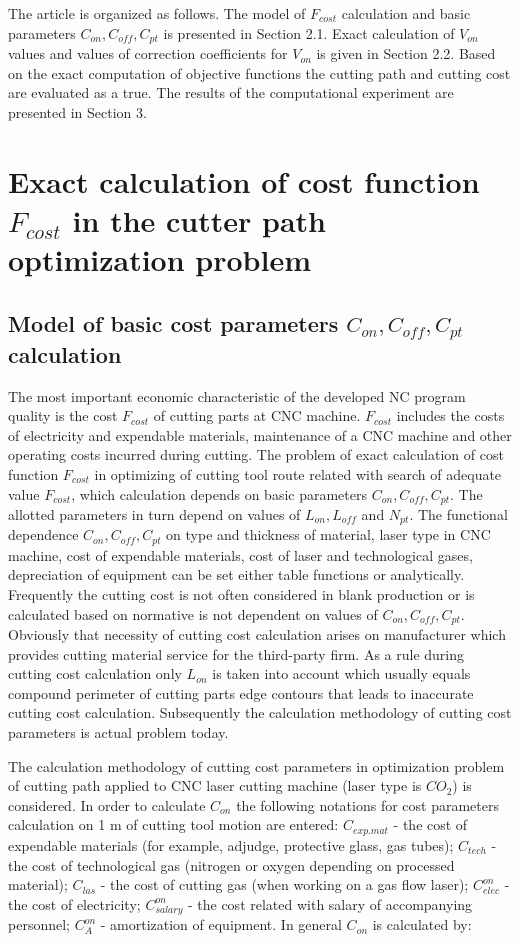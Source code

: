 \documentclass[runningheads]{llncs}
\begin{document}
The article is organized as follows.
The model of $F_{cost}$
calculation and basic parameters
$C_{on}, C_{off}, C_{pt}$
is presented in Section 2.1.
Exact calculation of $V_{on}$
values and values of correction coefficients for $V_{on}$
is given in Section 2.2.
Based on the exact computation of objective functions
the cutting path and cutting cost are evaluated as a true.
The results of the computational experiment are presented in Section 3.

\section{Exact calculation of cost function $F_{cost}$ in the cutter path optimization problem}

\subsection{Model of basic cost parameters $C_{on}, C_{off}, C_{pt}$ calculation}

The most important economic characteristic of the developed NC program quality is the cost $F_{cost}$
of cutting parts at CNC machine.
$F_{cost}$ includes the costs of electricity and expendable materials,
maintenance of a CNC machine and other operating costs incurred during cutting.
The problem of exact calculation of cost function $F_{cost}$
in optimizing of cutting tool route related with search of adequate value  $F_{cost}$,
which calculation depends on basic parameters $C_{on}, C_{off}, C_{pt}$.
The allotted parameters in turn depend on values of
$L_{on}, L_{off}$ and $N_{pt}$.
The functional dependence
$C_{on}, C_{off}, C_{pt}$
on type and thickness of material,
laser type in CNC machine,
cost of expendable materials,
cost of laser and technological gases,
depreciation of equipment
can be set either table functions or analytically.
Frequently the cutting cost is not often considered in blank production
or is calculated based on normative is not dependent on values of
$C_{on}, C_{off}, C_{pt}$.
Obviously that necessity of cutting cost calculation
arises on manufacturer which provides
cutting material service for the third-party firm.
As a rule during cutting cost calculation only
$L_{on}$
is taken into account
which usually equals compound perimeter of cutting parts edge contours
that leads to inaccurate cutting cost calculation.
Subsequently the calculation methodology of cutting cost parameters
is actual problem today.

The calculation methodology of
cutting cost parameters
in optimization problem of cutting path applied to CNC laser cutting machine
(laser type is $CO_2$)
is considered.
In order to calculate $C_{on}$
the following notations for cost parameters calculation on 1 m of cutting tool motion are entered:
$C_{exp.mat}$ - the cost of expendable materials
(for example, adjudge, protective glass, gas tubes);
$C_{tech}$  - the cost of technological gas
(nitrogen or oxygen depending on processed material);
$C_{las}$ - the cost of cutting gas
(when working on a gas flow laser);
$C^{on}_{elec}$ - the cost of electricity;
$C^{on}_{salary}$ - the cost related with salary of accompanying personnel;
$C^{on}_A$ - amortization of equipment.
In general
$C_{on}$
is calculated by:
\end{document}
